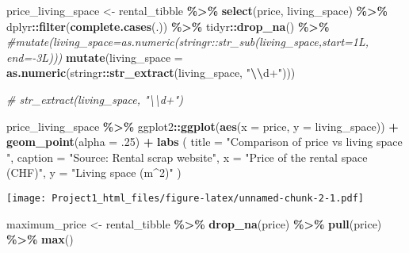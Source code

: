 \documentclass[
]{article}
\newenvironment{Shaded}{\begin{snugshade}}{\end{snugshade}}
\newcommand{\AttributeTok}[1]{\textcolor[rgb]{0.13,0.29,0.53}{#1}}
\newcommand{\CommentTok}[1]{\textcolor[rgb]{0.56,0.35,0.01}{\textit{#1}}}
\newcommand{\DecValTok}[1]{\textcolor[rgb]{0.00,0.00,0.81}{#1}}
\newcommand{\FunctionTok}[1]{\textcolor[rgb]{0.13,0.29,0.53}{\textbf{#1}}}
\newcommand{\NormalTok}[1]{#1}
\newcommand{\OtherTok}[1]{\textcolor[rgb]{0.56,0.35,0.01}{#1}}
\newcommand{\SpecialCharTok}[1]{\textcolor[rgb]{0.81,0.36,0.00}{\textbf{#1}}}
\newcommand{\StringTok}[1]{\textcolor[rgb]{0.31,0.60,0.02}{#1}}
\begin{document}
\begin{Shaded}
\begin{Highlighting}[]
\NormalTok{price\_living\_space }\OtherTok{\textless{}{-}}\NormalTok{ rental\_tibble }\SpecialCharTok{\%\textgreater{}\%}
  \FunctionTok{select}\NormalTok{(price, living\_space) }\SpecialCharTok{\%\textgreater{}\%}
\NormalTok{  dplyr}\SpecialCharTok{::}\FunctionTok{filter}\NormalTok{(}\FunctionTok{complete.cases}\NormalTok{(.)) }\SpecialCharTok{\%\textgreater{}\%}
\NormalTok{  tidyr}\SpecialCharTok{::}\FunctionTok{drop\_na}\NormalTok{() }\SpecialCharTok{\%\textgreater{}\%}
  \CommentTok{\#mutate(living\_space=as.numeric(stringr::str\_sub(living\_space,start=1L, end={-}3L)))}
  \FunctionTok{mutate}\NormalTok{(}\AttributeTok{living\_space =} \FunctionTok{as.numeric}\NormalTok{(stringr}\SpecialCharTok{::}\FunctionTok{str\_extract}\NormalTok{(living\_space, }\StringTok{"}\SpecialCharTok{\textbackslash{}\textbackslash{}}\StringTok{d+"}\NormalTok{)))}

\CommentTok{\# str\_extract(living\_space, "\textbackslash{}\textbackslash{}d+")}

\NormalTok{price\_living\_space }\SpecialCharTok{\%\textgreater{}\%}\NormalTok{  ggplot2}\SpecialCharTok{::}\FunctionTok{ggplot}\NormalTok{(}\FunctionTok{aes}\NormalTok{(}\AttributeTok{x =}\NormalTok{ price, }\AttributeTok{y =}\NormalTok{ living\_space)) }\SpecialCharTok{+}
  \FunctionTok{geom\_point}\NormalTok{(}\AttributeTok{alpha =}\NormalTok{ .}\DecValTok{25}\NormalTok{) }\SpecialCharTok{+}
  \FunctionTok{labs}\NormalTok{ (}
    \AttributeTok{title =} \StringTok{"Comparison of price vs living space "}\NormalTok{,}
    \AttributeTok{caption =} \StringTok{"Source: Rental scrap website"}\NormalTok{,}
    \AttributeTok{x =} \StringTok{"Price of the rental space (CHF)"}\NormalTok{,}
    \AttributeTok{y =} \StringTok{"Living space (m\^{}2)"}
\NormalTok{  )}
\end{Highlighting}
\end{Shaded}

\texttt{[image: Project1\_html\_files/figure-latex/unnamed-chunk-2-1.pdf]}

\begin{Shaded}
\begin{Highlighting}[]
\NormalTok{maximum\_price }\OtherTok{\textless{}{-}}\NormalTok{ rental\_tibble }\SpecialCharTok{\%\textgreater{}\%}
  \FunctionTok{drop\_na}\NormalTok{(price) }\SpecialCharTok{\%\textgreater{}\%}
  \FunctionTok{pull}\NormalTok{(price) }\SpecialCharTok{\%\textgreater{}\%} 
  \FunctionTok{max}\NormalTok{()}
\end{Highlighting}
\end{Shaded}
\end{document}
